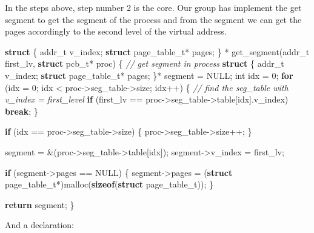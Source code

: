 \documentclass[]{article}
\newenvironment{Shaded}{}{}
\newcommand{\KeywordTok}[1]{\textcolor[rgb]{0.00,0.44,0.13}{\textbf{#1}}}
\newcommand{\DataTypeTok}[1]{\textcolor[rgb]{0.56,0.13,0.00}{#1}}
\newcommand{\DecValTok}[1]{\textcolor[rgb]{0.25,0.63,0.44}{#1}}
\newcommand{\CommentTok}[1]{\textcolor[rgb]{0.38,0.63,0.69}{\textit{#1}}}
\newcommand{\ControlFlowTok}[1]{\textcolor[rgb]{0.00,0.44,0.13}{\textbf{#1}}}
\newcommand{\NormalTok}[1]{#1}
\begin{document}
In the steps above, step number 2 is the core. Our group has implement
the get segment to get the segment of the process and from the segment
we can get the pages accordingly to the second level of the virtual
address.

\begin{Shaded}
\begin{Highlighting}[]
\KeywordTok{struct}\NormalTok{ \{}
\NormalTok{        addr_t v_index;}
        \KeywordTok{struct}\NormalTok{ page_table_t* pages;}
\NormalTok{\} * get_segment(addr_t first_lv, }\KeywordTok{struct}\NormalTok{ pcb_t* proc) \{}
        \CommentTok{// get segment in process}
        \KeywordTok{struct}\NormalTok{ \{}
\NormalTok{                addr_t v_index;}
                \KeywordTok{struct}\NormalTok{ page_table_t* pages;}
\NormalTok{        \}* segment = NULL;}
        \DataTypeTok{int}\NormalTok{ idx = }\DecValTok{0}\NormalTok{;}
        \ControlFlowTok{for}\NormalTok{ (idx = }\DecValTok{0}\NormalTok{; idx < proc->seg_table->size; idx++) \{}
                \CommentTok{// find the seg_table with v_index = first_level}
                \ControlFlowTok{if}\NormalTok{ (first_lv == proc->seg_table->table[idx].v_index)}
                        \ControlFlowTok{break}\NormalTok{;}
\NormalTok{        \}}

        \ControlFlowTok{if}\NormalTok{ (idx == proc->seg_table->size) \{}
\NormalTok{                proc->seg_table->size++;}
\NormalTok{        \}}

\NormalTok{        segment = &(proc->seg_table->table[idx]);}
\NormalTok{        segment->v_index = first_lv;}

        \ControlFlowTok{if}\NormalTok{ (segment->pages == NULL) \{}
\NormalTok{                segment->pages =}
\NormalTok{                    (}\KeywordTok{struct}\NormalTok{ page_table_t*)malloc(}\KeywordTok{sizeof}\NormalTok{(}\KeywordTok{struct}\NormalTok{ page_table_t));}
\NormalTok{        \}}

        \ControlFlowTok{return}\NormalTok{ segment;}
\NormalTok{\}}
\end{Highlighting}
\end{Shaded}

And a declaration:
\end{document}
